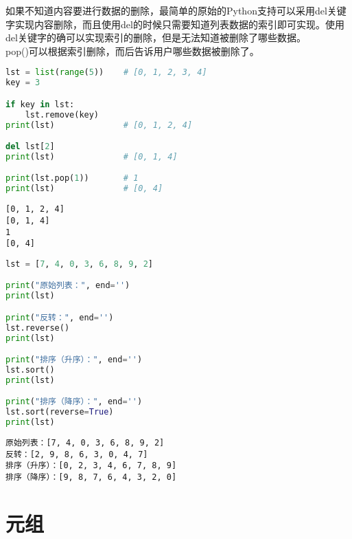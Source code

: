 如果不知道内容要进行数据的删除，最简单的原始的Python支持可以采用del关键字实现内容删除，而且使用del的时候只需要知道列表数据的索引即可实现。使用del关键字的确可以实现索引的删除，但是无法知道被删除了哪些数据。\\

pop()可以根据索引删除，而后告诉用户哪些数据被删除了。\\


\begin{lstlisting}[language=Python]
lst = list(range(5))    # [0, 1, 2, 3, 4]
key = 3

if key in lst:
    lst.remove(key)
print(lst)              # [0, 1, 2, 4]

del lst[2]
print(lst)              # [0, 1, 4]

print(lst.pop(1))       # 1
print(lst)              # [0, 4]
\end{lstlisting}

\begin{tcolorbox}
	\begin{verbatim}
[0, 1, 2, 4]
[0, 1, 4]
1
[0, 4]
\end{verbatim}
\end{tcolorbox}

\vspace{0.5cm}


\begin{lstlisting}[language=Python]
lst = [7, 4, 0, 3, 6, 8, 9, 2]

print("原始列表：", end='')
print(lst)

print("反转：", end='')
lst.reverse()
print(lst)

print("排序（升序）：", end='')
lst.sort()
print(lst)

print("排序（降序）：", end='')
lst.sort(reverse=True)
print(lst)
\end{lstlisting}

\begin{tcolorbox}
	\begin{verbatim}
原始列表：[7, 4, 0, 3, 6, 8, 9, 2]
反转：[2, 9, 8, 6, 3, 0, 4, 7]
排序（升序）：[0, 2, 3, 4, 6, 7, 8, 9]
排序（降序）：[9, 8, 7, 6, 4, 3, 2, 0]
\end{verbatim}
\end{tcolorbox}

\newpage

\section{元组}

